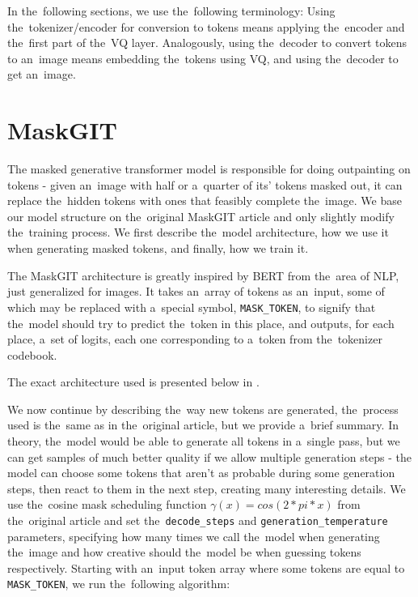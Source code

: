 In the~following sections, we use the~following terminology: Using the~tokenizer/encoder for conversion to tokens means applying the~encoder and the~first part of the~VQ layer. Analogously, using the~decoder to convert tokens to an~image means embedding the~tokens using VQ, and using the~decoder to get an~image.



\section{MaskGIT}

The masked generative transformer model \citep{maskgit} is responsible for doing outpainting on tokens - given an~image with half or a~quarter of its' tokens masked out, it can replace the~hidden tokens with ones that feasibly complete the~image. We base our model structure on the~original MaskGIT article and only slightly modify the~training process. We first describe the~model architecture, how we use it when generating masked tokens, and finally, how we train it.

The MaskGIT architecture is greatly inspired by BERT \citep{BERT} from the~area of NLP, just generalized for images. It takes an~array of tokens as an~input, some of which may be replaced with a~special symbol, \texttt{MASK\_TOKEN}, to signify that the~model should try to predict the~token in this place, and outputs, for each place, a~set of logits, each one corresponding to a~token from the~tokenizer codebook.

The exact architecture used is presented below in .



We now continue by describing the~way new tokens are generated, the~process used is the~same as in the~original article, but we provide a~brief summary. In theory, the~model would be able to generate all tokens in a~single pass, but we can get samples of much better quality if we allow multiple generation steps - the model can choose some tokens that aren't as probable during some generation steps, then react to them in the next step, creating many interesting details. We use the~cosine mask scheduling function $\gamma(x) = cos(2*pi*x)$ from the~original article and set the~\texttt{decode\_steps} and \texttt{generation\_temperature} parameters, specifying how many times we call the~model when generating the~image and how creative should the~model be when guessing tokens respectively.  Starting with an~input token array where some tokens are equal to \texttt{MASK\_TOKEN}, we run the~following algorithm:

